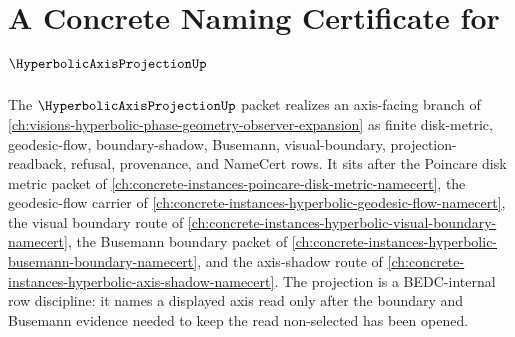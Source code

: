 \chapter{A Concrete Naming Certificate for $\HyperbolicAxisProjectionUp$}
\label{ch:concrete-instances-hyperbolic-axis-projection-namecert}

The $\HyperbolicAxisProjectionUp$ packet realizes an axis-facing branch of \autoref{ch:visions-hyperbolic-phase-geometry-observer-expansion} as finite disk-metric, geodesic-flow, boundary-shadow, Busemann, visual-boundary, projection-readback, refusal, provenance, and NameCert rows. It sits after the Poincare disk metric packet of \autoref{ch:concrete-instances-poincare-disk-metric-namecert}, the geodesic-flow carrier of \autoref{ch:concrete-instances-hyperbolic-geodesic-flow-namecert}, the visual boundary route of \autoref{ch:concrete-instances-hyperbolic-visual-boundary-namecert}, the Busemann boundary packet of \autoref{ch:concrete-instances-hyperbolic-busemann-boundary-namecert}, and the axis-shadow route of \autoref{ch:concrete-instances-hyperbolic-axis-shadow-namecert}. The projection is a BEDC-internal row discipline: it names a displayed axis read only after the boundary and Busemann evidence needed to keep the read non-selected has been opened.


